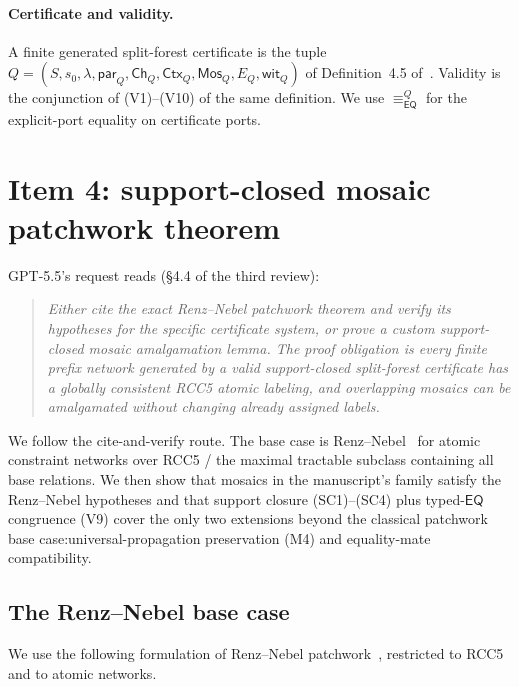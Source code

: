 \documentclass[11pt]{article}
\newcommand{\EQ}{\mathsf{EQ}}
\newcommand{\eqQ}{\equiv_{\EQ}^{Q}}
\newcommand{\Mos}{\mathsf{Mos}}
\newcommand{\Ctx}{\mathsf{Ctx}}
\newcommand{\parr}{\mathsf{par}}
\begin{document}
\paragraph{Certificate and validity.}  A finite generated split-forest
certificate is the tuple
\(Q = (S,s_0,\lambda,\parr_Q,\mathsf{Ch}_Q,\Ctx_Q,\Mos_Q,E_Q,\mathsf{wit}_Q)\)
of Definition~4.5 of~\cite{repaired}.  Validity is the conjunction
of (V1)--(V10) of the same definition.  We use \(\eqQ\) for the
explicit-port equality on certificate ports.

\section{Item 4: support-closed mosaic patchwork theorem}
\label{sec:patchwork}

GPT-5.5's request reads (\S4.4 of the third review):

\begin{quote}\itshape
Either cite the exact Renz--Nebel patchwork theorem and verify its
hypotheses for the specific certificate system, or prove a custom
support-closed mosaic amalgamation lemma.  The proof obligation is
\emph{every finite prefix network generated by a valid support-closed
split-forest certificate has a globally consistent RCC5 atomic
labeling, and overlapping mosaics can be amalgamated without changing
already assigned labels.}
\end{quote}

We follow the cite-and-verify route.  The base case is
Renz--Nebel~\cite{RenzNebel1999} for atomic constraint networks
over RCC5 / the maximal tractable subclass containing all base
relations.  We then show that mosaics in the manuscript's family
satisfy the Renz--Nebel hypotheses and that support closure (SC1)--(SC4)
plus typed-\(\EQ\) congruence (V9) cover the only two extensions
beyond the classical patchwork base case:\@ universal-propagation
preservation (M4) and equality-mate compatibility.

\subsection{The Renz--Nebel base case}

We use the following formulation of Renz--Nebel
patchwork~\cite{RenzNebel1999}, restricted to RCC5
and to atomic networks.
\end{document}
